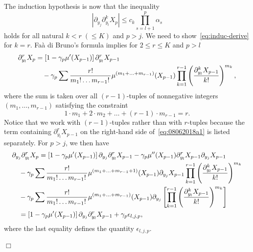 \documentclass[preprint]{imsart}
\newcommand{\proofendsign}{$\Box$}
\newenvironment{proof}{{\noindent \bf Proof }}
 {{\hspace*{\fill}\proofendsign\par\bigskip}}
\begin{document}
\begin{proof}
The induction hypothesis is now that the inequality
\begin{equation}\label{eq:induc-derive}
\left|\partial_{y_{j}}\partial_{y_{l}}^{k}X_{p}\right|
\leq c_{k}\prod_{s=l+1}^{p}\alpha_{s}
\end{equation}
holds for all natural $k<r\;(\le K)$ and $p>j$.
We need to show~\eqref{eq:induc-derive} for $k=r$.
Fa\`a di Bruno's formula implies for $2\le r\le K$ and $p>l$
\begin{align}
\partial_{y_{l}}^{r}X_{p}
&=\left[1-\gamma_{p}\mu'(X_{p-1})\right]\partial_{y_{l}}^{r}X_{p-1}
\label{eq:08062018a1}\\
&\hspace{1em}-\gamma_{p}\sum\frac{r!}{m_{1}!\ldots m_{r-1}!\,}\mu^{(m_{1}+\ldots+m_{r-1})}(X_{p-1})\prod_{k=1}^{r-1}\left(\frac{\partial_{y_{l}}^{k}X_{p-1}}{k!}\right)^{m_{k}},
\notag
\end{align}
where the sum is taken over all $(r-1)$-tuples of nonnegative integers
$(m_{1},\ldots,m_{r-1})$ satisfying the constraint
\begin{equation}\label{eq:09062018a1}
1\cdot m_{1}+2\cdot m_{2}+\ldots+(r-1)\cdot m_{r-1}=r.
\end{equation}
Notice that we work with $(r-1)$-tuples
rather than with $r$-tuples
because the term containing
$\partial_{y_l}^r X_{p-1}$
on the right-hand side of~\eqref{eq:08062018a1}
is listed separately.
For $p>j$, we then have
\begin{align}
&\partial_{y_{j}}\partial_{y_{l}}^{r}X_{p}
=\left[1-\gamma_{p}\mu'(X_{p-1})\right]\partial_{y_{j}}\partial_{y_{l}}^{r}X_{p-1}-\gamma_{p}\mu''(X_{p-1})\partial_{y_{l}}^{r}X_{p-1}\partial_{y_{j}}X_{p-1}
\label{eq:09062018a2}\\
&\hspace{1em}-\gamma_{p}\sum\frac{r!}{m_{1}!\ldots m_{r-1}!\,}\mu^{(m_{1}+\ldots+m_{r-1}+1)}(X_{p-1})\partial_{y_{j}}X_{p-1}\prod_{k=1}^{r-1}\left(\frac{\partial_{y_{l}}^{k}X_{p-1}}{k!}\right)^{m_{k}}
\notag\\
&\hspace{1em}-\gamma_{p}\sum\frac{r!}{m_{1}!\ldots m_{r-1}!\,}\mu^{(m_{1}+\ldots+m_{r-1})}(X_{p-1})\partial_{y_{j}}\left[\prod_{k=1}^{r-1}\left(\frac{\partial_{y_{l}}^{k}X_{p-1}}{k!}\right)^{m_{k}}\right]
\notag\\
&\hspace{1em} =\left[1-\gamma_{p}\mu'(X_{p-1})\right]\partial_{y_{j}}\partial_{y_{l}}^{r}X_{p-1}+\gamma_{p}\epsilon_{l,j,p},
\notag
\end{align}
where the last equality defines the quantity $\epsilon_{l,j,p}$.

\end{proof}
\end{document}
